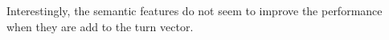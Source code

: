 Interestingly, the semantic features do not seem to improve the performance 
when they are add to the turn vector.







